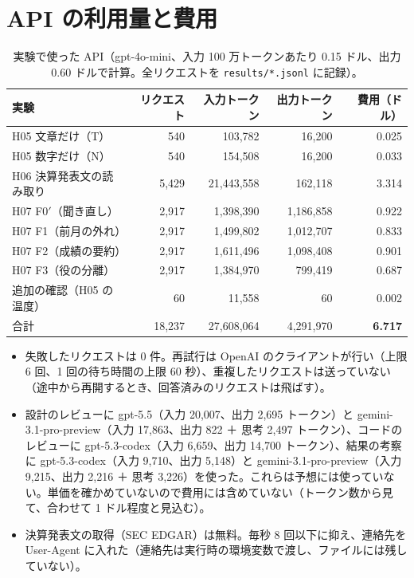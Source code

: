 \documentclass[xelatex,ja=standard,jafont=haranoaji,a4paper,10pt,openany]{bxjsreport}
\newcommand{\code}[1]{\texttt{#1}}
\begin{document}
\chapter{API の利用量と費用}\label{ch:cost}

\begin{table}[htbp]
\centering
\caption{実験で使った API（gpt-4o-mini、入力 100 万トークンあたり 0.15 ドル、出力 0.60 ドルで計算。全リクエストを \code{results/*.jsonl} に記録）。}
\label{tab:cost}
\small
\begin{tabular}{lrrrr}
\toprule
実験 & リクエスト & 入力トークン & 出力トークン & 費用（ドル） \\
\midrule
H05 文章だけ（T） & 540 & 103,782 & 16,200 & 0.025 \\
H05 数字だけ（N） & 540 & 154,508 & 16,200 & 0.033 \\
H06 決算発表文の読み取り & 5,429 & 21,443,558 & 162,118 & 3.314 \\
H07 F0$'$（聞き直し） & 2,917 & 1,398,390 & 1,186,858 & 0.922 \\
H07 F1（前月の外れ） & 2,917 & 1,499,802 & 1,012,707 & 0.833 \\
H07 F2（成績の要約） & 2,917 & 1,611,496 & 1,098,408 & 0.901 \\
H07 F3（役の分離） & 2,917 & 1,384,970 & 799,419 & 0.687 \\
追加の確認（H05 の温度） & 60 & 11,558 & 60 & 0.002 \\
\midrule
合計 & 18,237 & 27,608,064 & 4,291,970 & \textbf{6.717} \\
\bottomrule
\end{tabular}
\end{table}

\begin{itemize}
\item 失敗したリクエストは 0 件。再試行は OpenAI のクライアントが行い（上限 6 回、1 回の待ち時間の上限 60 秒）、重複したリクエストは送っていない（途中から再開するとき、回答済みのリクエストは飛ばす）。
\item 設計のレビューに gpt-5.5（入力 20,007、出力 2,695 トークン）と gemini-3.1-pro-preview（入力 17,863、出力 822 ＋ 思考 2,497 トークン）、コードのレビューに gpt-5.3-codex（入力 6,659、出力 14,700 トークン）、結果の考察に gpt-5.3-codex（入力 9,710、出力 5,148）と gemini-3.1-pro-preview（入力 9,215、出力 2,216 ＋ 思考 3,226）を使った。これらは予想には使っていない。単価を確かめていないので費用には含めていない（トークン数から見て、合わせて 1 ドル程度と見込む）。
\item 決算発表文の取得（SEC EDGAR）は無料。毎秒 8 回以下に抑え、連絡先を User-Agent に入れた（連絡先は実行時の環境変数で渡し、ファイルには残していない）。
\end{itemize}
\end{document}
